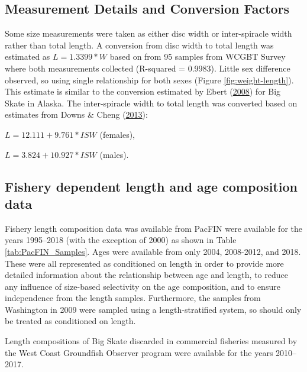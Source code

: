 \documentclass[12pt,]{article}
\begin{document}
\hypertarget{measurement-details-and-conversion-factors}{%
\subsection{Measurement Details and Conversion
Factors}\label{measurement-details-and-conversion-factors}}

Some size measurements were taken as either disc width or inter-spiracle
width rather than total length. A conversion from disc width to total
length was estimated as \(L = 1.3399 * W\) based on from 95 samples from
WCGBT Survey where both measurements collected (R-squared = 0.9983).
Little sex difference observed, so using single relationship for both
sexes (Figure \ref{fig:weight-length}). This estimate is similar to the
conversion estimated by Ebert (\protect\hyperlink{ref-Ebert2008}{2008})
for Big Skate in Alaska. The inter-spiracle width to total length was
converted based on estimates from Downs \& Cheng
(\protect\hyperlink{ref-Downs2013}{2013}):

\begin{centering}

$L = 12.111 + 9.761*ISW$ (females),

$L = 3.824 + 10.927*ISW$ (males).

\end{centering}

\hypertarget{fishery-dependent-length-and-age-composition-data}{%
\subsection{Fishery dependent length and age composition
data}\label{fishery-dependent-length-and-age-composition-data}}

Fishery length composition data was available from PacFIN were available
for the years 1995--2018 (with the exception of 2000) as shown in Table
\ref{tab:PacFIN_Samples}. Ages were available from only 2004, 2008-2012,
and 2018. These were all represented as conditioned on length in order
to provide more detailed information about the relationship between age
and length, to reduce any influence of size-based selectivity on the age
composition, and to ensure independence from the length samples.
Furthermore, the samples from Washington in 2009 were sampled using a
length-stratified system, so should only be treated as conditioned on
length.

Length compositions of Big Skate discarded in commercial fisheries
measured by the West Coast Groundfish Observer program were available
for the years 2010--2017.
\end{document}
